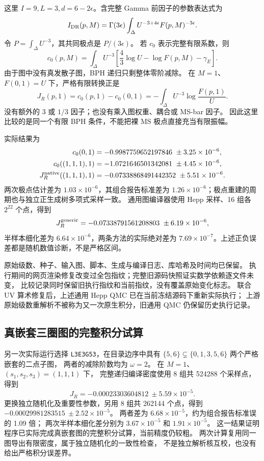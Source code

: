 这里 $I=9,L=3,d=6-2\epsilon$。含完整 Gamma 前因子的参数表达式为
\[
 I_{\rm DR}(p,M)=\Gamma(3\epsilon)
       \int_\Delta U^{-3+4\epsilon}F(p,M)^{-3\epsilon}.
\]
令 $P=\int_\Delta U^{-3}$，其共同极点是 $P/(3\epsilon)$。
若 $c_0$ 表示完整有限系数，则
\[
 c_0(p,M)=\int_\Delta U^{-3}
       \left[\frac43\log U-\log F(p,M)-\gamma_E\right].
\]
由于图中没有真发散子图，BPH 递归只剩整体零阶减除。
在 $M=1$、$F(0,1)=U$ 下，严格有限转换正是
\[
 J_R(p,1)=c_0(p,1)-c_0(0,1)
 =-\int_\Delta U^{-3}\log\frac{F(p,1)}U.
\]
没有额外的 3 或 $1/3$ 因子；也没有乘入图权重、耦合或 MS-bar 因子。
因此这里比较的是同一个有限 BPH 条件，不能把裸 MS 极点直接充当有限振幅。

实际结果为
\begin{align*}
 c_0(0,1)&=-0.9987759652197846\ \pm3.25\times10^{-6},\\
 c_0((1,1,1),1)&=-1.0721646501342081\ \pm4.45\times10^{-6},\\
 J_R^{\rm native}((1,1,1),1)
 &=-0.07338868491442352\ \pm5.51\times10^{-6}.
\end{align*}
两次极点估计差为 $1.03\times10^{-6}$，其组合报告标准差为
$1.26\times10^{-6}$；极点重建的周期也与独立正生成树多项式采样一致。
通用图编译器使用 Hepp 采样、16 组各 $2^{22}$ 个点，得到
\[
 J_R^{\rm generic}=-0.07338791561208803\ \pm6.19\times10^{-6},
\]
半样本细化差为 $6.64\times10^{-6}$，两条方法的实际绝对差为
$7.69\times10^{-7}$。上述正负误差都是随机数值诊断，不是严格区间。

原始级数、种子、输入图、脚本、生成与编译日志、库哈希及时间均已保留。
执行期间的网页渲染修复改变过全包指纹；完整旧源码快照证实数学依赖逐文件未变，
比较记录同时保留旧执行指纹和当前指纹，没有覆盖原始变化标志。
联合 UV 算术修复后，上述通用 Hepp QMC 已在当前冻结源码下重新实际执行；
上游原始级数重解析不被称为又一次原生积分，旧通用 QMC 仍保留历史执行记录。

\subsection{真嵌套三圈图的完整积分试算}

另一次实际运行选择 \texttt{L3E3G53}，在目录边序中具有
$\{5,6\}\subsetneq\{0,1,3,5,6\}$ 两个严格嵌套的二点子图，
两者的减除阶数均为 $\omega=2$。
在 $M=1$、$(s_1,s_2,s_3)=(1,1,1)$ 下，
完整递归编译密度使用 8 组共 524288 个采样点，得到
\[
 J_R=-0.00023303604812\ \pm5.59\times10^{-5}.
\]
更换独立随机化及重要性参数，另用 8 组共 262144 个点，得到
$-0.00029981283515\ \pm2.52\times10^{-5}$。
两者差为 $6.68\times10^{-5}$，约为组合报告标准误的 1.09 倍；
两次半样本细化差分别为 $3.67\times10^{-5}$ 和 $1.91\times10^{-5}$。
这一结果证明程序已实际完成真嵌套图的完整积分试算，当前精度仍较粗。
两次计算复用同一图导出有限密度，属于独立随机化的一致性检查，
不是独立解析核互校，也没有给出严格积分误差界。

